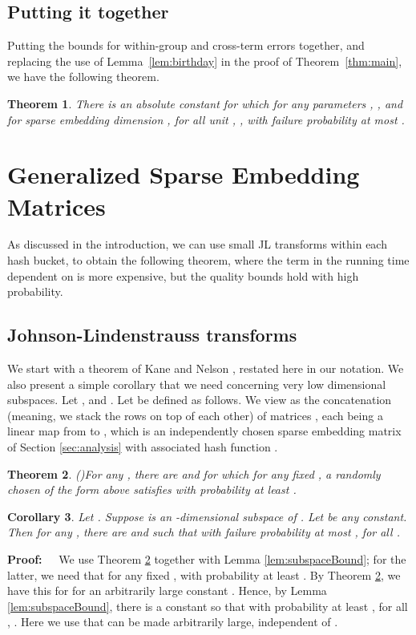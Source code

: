 \documentclass{sig-alternate}
\newtheorem{theorem}{Theorem}
\newtheorem{corollary}[theorem]{Corollary}
\def\FullBox{\hbox{\vrule width 8pt height 8pt depth 0pt}}
\def\qed{\ifmmode\qquad\FullBox\else{\unskip\nobreak\hfil
\penalty50\hskip1em\null\nobreak\hfil\FullBox
\parfillskip=0pt\finalhyphendemerits=0\endgraf}\fi}
\newenvironment{proof}{\begin{trivlist} \item {\bf Proof:~~}}
  {\qed\end{trivlist}}
\begin{document}
\subsection{Putting it together}

Putting the bounds for within-group and cross-term errors together, and replacing
the use of Lemma~\ref{lem:birthday} in the proof of Theorem~\ref{thm:main},
we have the following theorem.

\fi 

\begin{theorem}\label{thm:partition main}
There is an absolute constant  for which 
for any parameters , , and for sparse embedding dimension 
, for all unit ,
,
with failure probability at most .
\end{theorem}

\section{Generalized Sparse Embedding Matrices}\label{sec:generalized}

\ifSTOC
As discussed in the introduction, we can use small JL transforms within each hash bucket,
to obtain the following theorem, where the term in the running time
dependent on  is more expensive, but the quality bounds hold with high probability.
\else

\subsection{Johnson-Lindenstrauss transforms}
We start with a theorem of Kane and Nelson \cite{KN12}, restated here in our notation. We also
present a simple corollary that we need concerning very low dimensional subspaces. 
Let , and .
Let  be defined as follows. 
We view  as the concatenation (meaning, we stack the rows on top of each other) 
of matrices , 
each 
being a linear map from  to , which is an independently
chosen sparse embedding matrix of Section \ref{sec:analysis} with
associated hash function . 
\begin{theorem}(\cite{KN12})\label{thm:general}
For any ,
there are  and 
for which for any fixed , a randomly chosen  of the form above satisfies
 with probability at least . 
\end{theorem}
\begin{corollary}\label{cor:subspace}
Let .
Suppose  is an -dimensional subspace of .
Let  be any constant.
Then for any , there 
are  and  
such that with failure probability at most 
 ,  for all .
\end{corollary}
\begin{proof}
We use Theorem \ref{thm:general} together with Lemma \ref{lem:subspaceBound};
for the latter, we need that for any fixed ,  with probability at least
. By Theorem \ref{thm:general}, we have this for  for an arbitrarily large constant .
Hence, by Lemma \ref{lem:subspaceBound}, there is a constant  
so that with probability at least
,
for all , 
. Here we use that  can be made arbitrarily large, independent of . 
\end{proof} 
\end{document}
